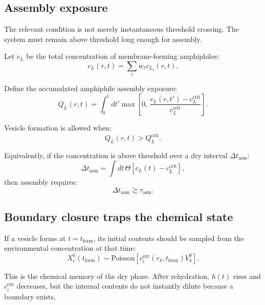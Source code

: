 \documentclass[11pt]{article}
\begin{document}
\subsection{Assembly exposure}

The relevant condition is not merely instantaneous threshold crossing. The
system must remain above threshold long enough for assembly.

Let $c_L$ be the total concentration of membrane-forming amphiphiles:
\begin{equation}
    c_L(r,t) =
    \sum_{\ell} w_\ell c_{L_\ell}(r,t).
\end{equation}

Define the accumulated amphiphile assembly exposure:
\begin{equation}
    Q_L(r,t)
    =
    \int_0^t
    dt'
    \max\left[
    0,\,
    \frac{c_L(r,t')-c_L^{\mathrm{crit}}}
    {c_L^{\mathrm{crit}}}
    \right].
\end{equation}

Vesicle formation is allowed when:
\begin{equation}
    Q_L(r,t) > Q_L^{\mathrm{crit}}.
\end{equation}

Equivalently, if the concentration is above threshold over a dry interval
$\Delta t_{\mathrm{asm}}$:
\begin{equation}
    \Delta t_{\mathrm{asm}}
    =
    \int dt\,
    \Theta\left[c_L(t)-c_L^{\mathrm{crit}}\right],
\end{equation}
then assembly requires:
\begin{equation}
    \Delta t_{\mathrm{asm}} \gtrsim \tau_{\mathrm{asm}}.
\end{equation}

\subsection{Boundary closure traps the chemical state}

If a vesicle forms at $t=t_{\mathrm{form}}$, its initial contents should be
sampled from the environmental concentration at that time:
\begin{equation}
    X_i^k(t_{\mathrm{form}})
    \sim
    \mathrm{Poisson}
    \left[
    c_i^{\mathrm{ext}}(r_k,t_{\mathrm{form}})V_k^0
    \right].
\end{equation}

This is the chemical memory of the dry phase. After rehydration, $h(t)$ rises
and $c_i^{\mathrm{ext}}$ decreases, but the internal contents do not instantly
dilute because a boundary exists.
\end{document}
